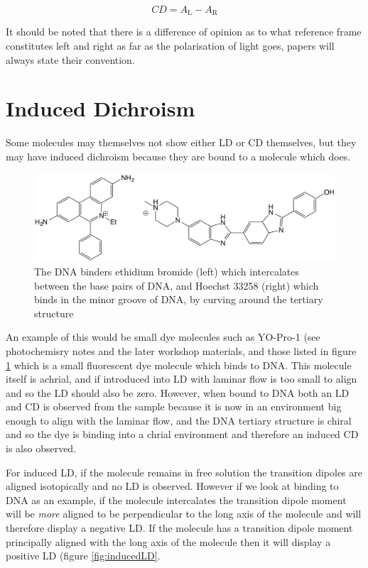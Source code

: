 \documentclass[
]{book}
\begin{document}
\begin{equation}
CD = A_{\textrm{L}} - A_{\textrm{R}}
\label{eq:CD}
\end{equation}

It should be noted that there is a difference of opinion as to what reference frame constitutes left and right as far as the polarisation of light goes, papers will always state their convention.

\hypertarget{induced-dichroism}{%
\section{Induced Dichroism}\label{induced-dichroism}}

Some molecules may themselves not show either LD or CD themselves, but they may have induced dichroism because they are bound to a molecule which does.

\begin{figure}

{\centering \includegraphics[width=0.6\linewidth]{images/DNAbinders} 

}

\caption{The DNA binders ethidium bromide (left) which intercalates between the base pairs of DNA, and Hoechst 33258 (right) which binds in the minor groove of DNA, by curving around the tertiary structure}\label{fig:DNAbinders}
\end{figure}

An example of this would be small dye molecules such as YO-Pro-1 (see photochemisry notes and the later workshop materials, and those listed in figure \ref{fig:DNAbinders} which is a small fluorescent dye molecule which binds to DNA. This molecule itself is achrial, and if introduced into LD with laminar flow is too small to align and so the LD should also be zero. However, when bound to DNA both an LD and CD is observed from the sample because it is now in an environment big enough to align with the laminar flow, and the DNA tertiary structure is chiral and so the dye is binding into a chrial environment and therefore an induced CD is also observed.

For induced LD, if the molecule remains in free solution the transition dipoles are aligned isotopically and no LD is observed. However if we look at binding to DNA as an example, if the molecule intercalates the transition dipole moment will be \emph{more} aligned to be perpendicular to the long axis of the molecule and will therefore display a negative LD. If the molecule has a transition dipole moment principally aligned with the long axis of the molecule then it will display a positive LD (figure \ref{fig:inducedLD}.
\end{document}
